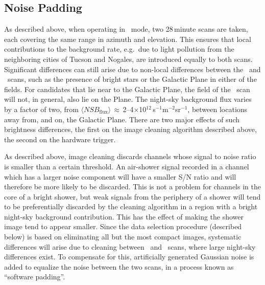 \subsection{Noise Padding}
\label{SUBSEC::ANALYSIS::PADDING}

As described above, when operating in \Pairs\ mode, two 28\,minute
scans are taken, each covering the same range in azimuth and
elevation. This ensures that local contributions to the background
rate, e.g.\ due to light pollution from the neighboring cities of
Tucson and Nogales, are introduced equally to both scans. Significant
differences can still arise due to non-local differences between the
\On\ and \Off\ scans, such as the presence of bright stars or the
Galactic Plane in either of the fields. For candidates that lie near
to the Galactic Plane, the field of the \Off\ scan will not, in
general, also lie on the Plane. The night-sky background flux varies
by a factor of two, from
${\langle}NSB_{\mathrm{flux}}\rangle$\,$\approx$\,2--4$\times$10$^{12}$\,s$^{-1}$m$^{-2}$sr$^{-1}$,
between locations away from, and on, the Galactic Plane. There are two
major effects of such brightness differences, the first on the image
cleaning algorithm described above, the second on the hardware
trigger.

As described above, image cleaning discards channels whose signal to
noise ratio is smaller than a certain threshold. An air-shower signal
recorded in a channel which has a larger noise component will have a
smaller S/N ratio and will therefore be more likely to be
discarded. This is not a problem for channels in the core of a bright
shower, but weak signals from the periphery of a shower will tend to
be preferentially discarded by the cleaning algorithm in a region with
a bright night-sky background contribution. This has the effect of
making the shower image tend to appear smaller. Since the data
selection procedure (described below) is based on eliminating all but
the most compact images, systematic differences will arise due to
cleaning between \On\ and \Off\ scans, where large night-sky
differences exist. To compensate for this, artificially generated
Gaussian noise is added to equalize the noise between the two scans,
in a process known as ``software padding''.

